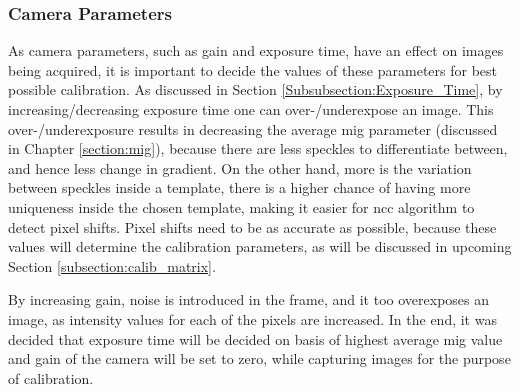     \subsubsection*{Camera Parameters}\label{subsection:camera_parameters}
        As camera parameters, such as gain and exposure time, have an effect on images being acquired, it is important to decide the values of these parameters for best possible calibration. As discussed in Section \ref{Subsubsection:Exposure_Time}, by increasing/decreasing exposure time one can over-/underexpose an image. This over-/underexposure results in decreasing the average \gls{mig} parameter (discussed in Chapter \ref{section:mig}), because there are less speckles to differentiate between, and hence less change in gradient. On the other hand, more is the variation between speckles inside a template, there is a higher chance of having more uniqueness inside the chosen template, making it easier for \gls{ncc} algorithm to detect pixel shifts. Pixel shifts need to be as accurate as possible, because these values will determine the calibration parameters, as will be discussed in upcoming Section \ref{subsection:calib_matrix}. 
        
        \vspace{5mm}
        \noindent By increasing gain, noise is introduced in the frame, and it too overexposes an image, as intensity values for each of the pixels are increased. In the end, it was decided that exposure time will be decided on basis of highest average \gls{mig} value and gain of the camera will be set to zero, while capturing images for the purpose of calibration.

